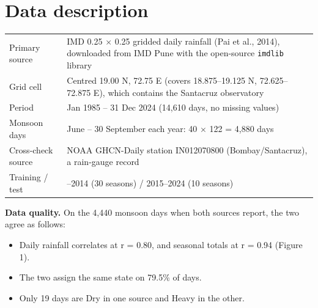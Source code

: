\documentclass[11pt,a4paper]{article}
\providecommand{\tightlist}{\setlength{\itemsep}{0pt}\setlength{\parskip}{0pt}}
\begin{document}
\section{Data description}\label{data-description}



{\def\LTcaptype{none} %

\begin{longtable}[]{@{}

  >{\raggedright\arraybackslash}p{}

  >{\raggedright\arraybackslash}p{}@{}}

\toprule\noalign{}

\endhead

\bottomrule\noalign{}

\endlastfoot

Primary source & IMD 0.25\textdegree{} $\times$ 0.25\textdegree{} gridded daily rainfall (Pai et al., 2014), downloaded from IMD Pune with the open-source \texttt{imdlib} library \\

Grid cell & Centred 19.00\textdegree{} N, 72.75\textdegree{} E (covers 18.875--19.125\textdegree{} N, 72.625--72.875\textdegree{} E), which contains the Santacruz observatory \\

Period & 1 Jan 1985 -- 31 Dec 2024 (14,610 days, no missing values) \\

Monsoon days & 1 June -- 30 September each year: 40 $\times$ 122 = 4,880 days \\

Cross-check source & NOAA GHCN-Daily station IN012070800 (Bombay/Santacruz), a rain-gauge record \\

Training / test & 1985--2014 (30 seasons) / 2015--2024 (10 seasons) \\

\end{longtable}

}



\textbf{Data quality.} On the 4,440 monsoon days when both sources report, the two agree as follows:



\begin{itemize}

\tightlist

\item

  Daily rainfall correlates at r = 0.80, and seasonal totals at r = 0.94 (Figure 1).

\item

  The two assign the same state on 79.5\% of days.

\item

  Only 19 days are Dry in one source and Heavy in the other.

\end{itemize}
\end{document}

